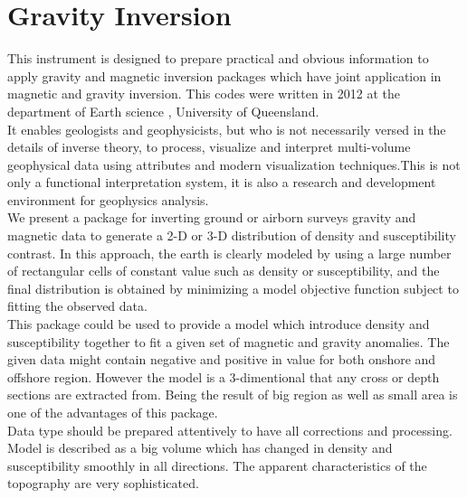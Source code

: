 \chapter{Gravity Inversion}\label{Chp:cook:gravity inversion}

This instrument is designed to prepare practical and obvious information to apply gravity and magnetic inversion packages which have joint application in magnetic and gravity inversion. This codes were written in 2012 at the department of Earth science , University of Queensland.\\
It enables geologists and geophysicists, but who is not necessarily versed in the details of inverse theory, to process, visualize and interpret multi-volume geophysical data using attributes and modern visualization techniques.This is not only a functional interpretation system, it is also a research and development environment for geophysics analysis.\\
We present a package for inverting ground or airborn surveys gravity and magnetic data to generate a 2-D or 3-D distribution of density and susceptibility contrast. In this approach, the earth is clearly modeled by using a large number of rectangular cells of constant value such as density or susceptibility, and the final distribution is obtained by minimizing a model objective function subject to fitting the observed data.\\
This package could be used to provide a model which introduce density and susceptibility together to fit a given set of magnetic and gravity anomalies. The given data might contain negative and positive in value for both onshore and offshore region. However the model is a 3-dimentional that any cross or depth sections are extracted from. Being the result of big region as well as small area is one of the advantages of this package.\\
Data type should be prepared attentively to have all corrections and processing. Model is described as a big volume which has changed in density and susceptibility smoothly in all directions. The apparent characteristics of the topography are very sophisticated.\\
\newpage

